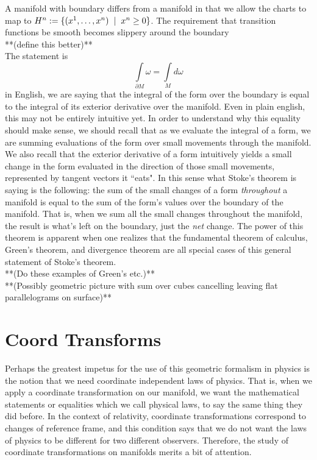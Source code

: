 A manifold with boundary differs from a manifold in that we allow the charts to map to $H^n := \{(x^1, \dots, x^n) \hspace{2mm} | \hspace{2mm}  x^n \geq 0\}$.  The requirement that transition functions be smooth becomes slippery around the boundary\\
**(define this better)**\\

The statement is
\begin{equation*}
	\int\limits_{\partial M} \omega = \int\limits_M d\omega
\end{equation*}
in English, we are saying that the integral of the form over the boundary is equal to the integral of its exterior derivative over the manifold.  Even in plain english, this may not be entirely intuitive yet.  In order to understand why this equality should make sense, we should recall that as we evaluate the integral of a form, we are summing evaluations of the form over small movements through the manifold.  We also recall that the exterior derivative of a form intuitively yields a small change in the form evaluated in the direction of those small movements, represented by tangent vectors it ``eats".  In this sense what Stoke's theorem is saying is the following: the sum of the small changes of a form \textit{throughout} a manifold is equal to the sum of the form's values over the boundary of the manifold.  That is, when we sum all the small changes throughout the manifold, the result is what's left on the boundary, just the \textit{net} change.  The power of this theorem is apparent when one realizes that the fundamental theorem of calculus, Green's theorem, and divergence theorem are all special cases of this general statement of Stoke's theorem.\\

**(Do these examples of Green's etc.)**\\

**(Possibly geometric picture with sum over cubes cancelling leaving flat parallelograms on surface)**

\section*{Coord Transforms}
Perhaps the greatest impetus for the use of this geometric formalism in physics is the notion that we need coordinate independent laws of physics.  That is, when we apply a coordinate transformation on our manifold, we want the mathematical statements or equalities which we call physical laws, to say the same thing they did before.  In the context of relativity, coordinate transformations correspond to changes of reference frame, and this condition says that we do not want the laws of physics to be different for two different observers.  Therefore, the study of coordinate transformations on manifolds merits a bit of attention.\\

